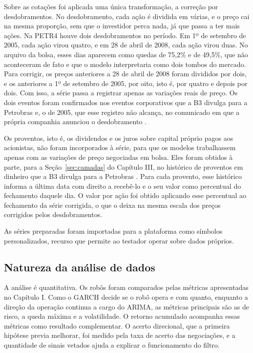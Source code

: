 Sobre as cotações foi aplicada uma única transformação, a correção por
desdobramentos. No desdobramento, cada ação é dividida em várias, e o preço cai na
mesma proporção, sem que o investidor perca nada, já que passa a ter mais ações.
Na PETR4 houve dois desdobramentos no período. Em 1º de setembro de 2005, cada ação
virou quatro, e em 28 de abril de 2008, cada ação virou duas. No arquivo da bolsa,
esses dias aparecem como quedas de 75,2\% e de 49,5\%, que não aconteceram de fato
e que o modelo interpretaria como dois tombos do mercado. Para corrigir, os preços
anteriores a 28 de abril de 2008 foram divididos por dois, e os anteriores a 1º de
setembro de 2005, por oito, isto é, por quatro e depois por dois. Com isso, a série
passa a registrar apenas as variações reais de preço. Os dois eventos foram
confirmados nos eventos corporativos que a B3 divulga para a Petrobras
\cite{b3Petrobras} e, o de 2005, que esse registro não alcança, no comunicado em
que a própria companhia anunciou o desdobramento \cite{petrobras2005}.

Os proventos, isto é, os dividendos e os juros sobre capital próprio pagos aos
acionistas, não foram incorporados à série, para que os modelos trabalhassem
apenas com as variações de preço negociadas em bolsa. Eles foram obtidos à parte,
para a Seção~\ref{sec:camadas} do Capítulo III, no histórico de proventos em dinheiro
que a B3 divulga para a Petrobras \cite{b3Petrobras}. Para cada provento, esse
histórico informa a última data com direito a recebê-lo e o seu valor como
percentual do fechamento daquele dia. O valor por ação foi obtido aplicando esse
percentual ao fechamento da série corrigida, o que o deixa na mesma escala dos
preços corrigidos pelos desdobramentos.

As séries preparadas foram importadas para a plataforma como símbolos
personalizados, recurso que permite ao testador operar sobre dados próprios.

\subsection{Natureza da análise de dados}

A análise é quantitativa. Os robôs foram comparados pelas métricas apresentadas
no Capítulo I. Como o GARCH decide se o robô opera e com quanto, enquanto a direção
da operação continua a cargo do ARIMA, as métricas principais são as de
risco, a queda máxima e a volatilidade. O retorno acumulado acompanha essas
métricas como resultado complementar. O acerto direcional, que a primeira hipótese
previa melhorar, foi medido pela taxa de acerto das negociações, e a quantidade de
sinais vetados ajuda a explicar o funcionamento do filtro.

